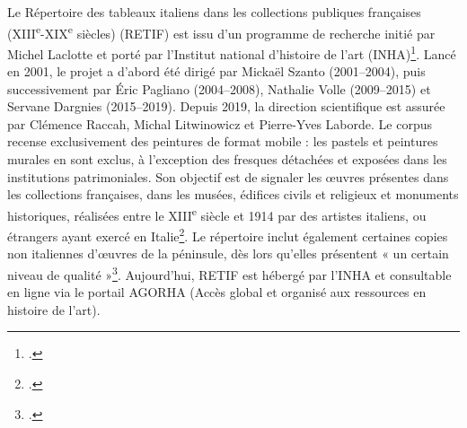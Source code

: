 Le Répertoire des tableaux italiens dans les collections publiques françaises (XIII\textsuperscript{e}-XIX\textsuperscript{e} siècles) (RETIF) est issu d’un programme de recherche initié par Michel Laclotte et porté par l’Institut national d’histoire de l’art (INHA)\footcite{volleMichelLaclotteRepertoire2024}. Lancé en 2001, le projet a d’abord été dirigé par Mickaël Szanto (2001–2004), puis successivement par Éric Pagliano (2004–2008), Nathalie Volle (2009–2015) et Servane Dargnies (2015–2019). Depuis 2019, la direction scientifique est assurée par Clémence Raccah, Michal Litwinowicz et Pierre-Yves Laborde. Le corpus recense exclusivement des peintures de format mobile : les pastels et peintures murales en sont exclus, à l’exception des fresques détachées et exposées dans les institutions patrimoniales. Son objectif est de signaler les œuvres présentes dans les collections françaises, dans les musées, édifices civils et religieux et monuments historiques, réalisées entre le XIII\textsuperscript{e} siècle et 1914 par des artistes italiens, ou étrangers ayant exercé en Italie\footcite{gianeselliInterrogerBaseLigne2011}. Le répertoire inclut également certaines copies non italiennes d’œuvres de la péninsule, dès lors qu’elles présentent « un certain niveau de qualité »\footcite{institutnationaldhistoiredelartRepertoireTableauxItaliens}. Aujourd’hui, RETIF est hébergé par l’INHA et consultable en ligne via le portail AGORHA (Accès global et organisé aux ressources en histoire de l’art).

